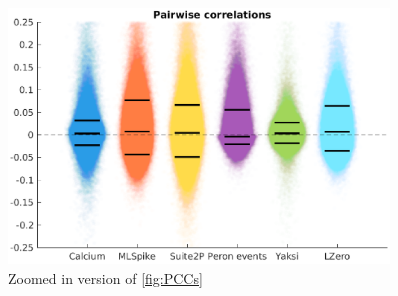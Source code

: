 \documentclass[a4paper]{article}
\begin{document}
\begin{figure}[h!]
\centering
\includegraphics[width=0.9\textwidth]{pairwise_scatter3_alph_pt01_zoom.eps}
\caption{\label{fig:PCCs_zoom}Zoomed in version of \ref{fig:PCCs} }
\end{figure}
\end{document}

